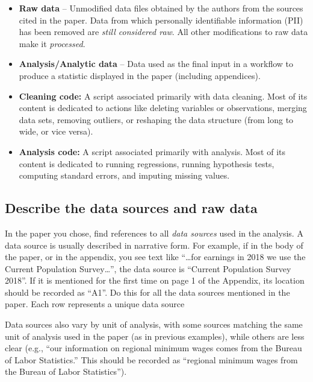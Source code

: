 \documentclass[
]{book}
\providecommand{\tightlist}{%
  \setlength{\itemsep}{0pt}\setlength{\parskip}{0pt}}
\begin{document}
\begin{itemize}
\tightlist
\item
  \textbf{Raw data} -- Unmodified data files obtained by the authors from the sources cited in the paper. Data from which personally identifiable information (PII) has been removed are \emph{still considered raw}. All other modifications to raw data make it \emph{processed}.\\
\item
  \textbf{Analysis/Analytic data} -- Data used as the final input in a workflow to produce a statistic displayed in the paper (including appendices).\\
\item
  \textbf{Cleaning code:} A script associated primarily with data cleaning. Most of its content is dedicated to actions like deleting variables or observations, merging data sets, removing outliers, or reshaping the data structure (from long to wide, or vice versa).\\
\item
  \textbf{Analysis code:} A script associated primarily with analysis. Most of its content is dedicated to running regressions, running hypothesis tests, computing standard errors, and imputing missing values.
\end{itemize}

\hypertarget{desc-sourc}{%
\subsection{Describe the data sources and raw data}\label{desc-sourc}}

In the paper you chose, find references to all \emph{data sources} used in the analysis. A data source is usually described in narrative form. For example, if in the body of the paper, or in the appendix, you see text like ``\ldots for earnings in 2018 we use the Current Population Survey\ldots{}'', the data source is ``Current Population Survey 2018''. If it is mentioned for the first time on page 1 of the Appendix, its location should be recorded as ``A1''. Do this for all the data sources mentioned in the paper. Each row represents a unique data source

Data sources also vary by unit of analysis, with some sources matching the same unit of analysis used in the paper (as in previous examples), while others are less clear (e.g., ``our information on regional minimum wages comes from the Bureau of Labor Statistics.'' This should be recorded as ``regional minimum wages from the Bureau of Labor Statistics'').
\end{document}
